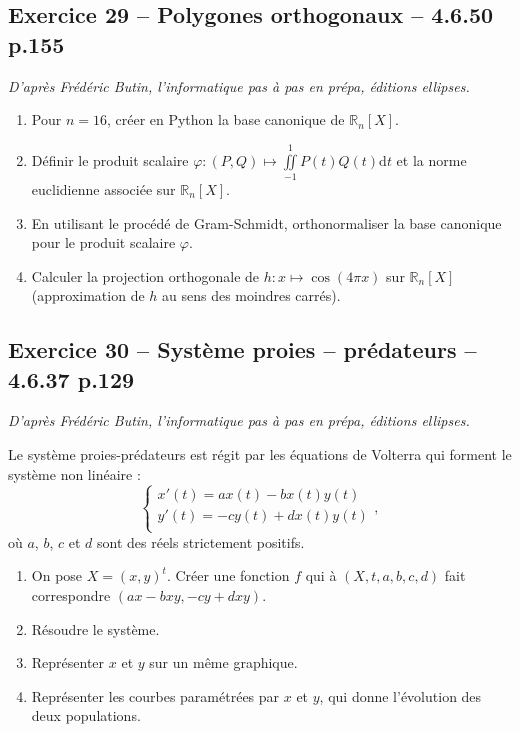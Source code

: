 \documentclass[10pt,fleqn]{article} %
\begin{document}
\begin{multicols}{2}
\subsection*{Exercice 29 -- Polygones orthogonaux -- 4.6.50 p.155}
\begin{flushright}
\textit{D'après Frédéric Butin, l'informatique pas à pas en prépa, éditions ellipses.}
\end{flushright}
\begin{enumerate}
\item Pour $n=16$, créer en Python la base canonique de $\mathbb{R}_n[X]$. 
\item Définir le produit scalaire $\varphi : \left( P,Q\right) \mapsto \iint\limits_{-1}^{1} P(t) Q(t) \text{d}t$ et la norme euclidienne associée sur $\mathbb{R}_n[X]$. 
\item En utilisant le procédé de Gram-Schmidt, orthonormaliser la  base canonique pour le produit scalaire $\varphi$.
\item Calculer la projection orthogonale de $h:x\mapsto \cos \left( 4\pi x\right)$ sur $\mathbb{R}_n[X]$ (approximation de $h$ au sens des moindres carrés).
\end{enumerate}


\subsection*{Exercice 30 -- Système proies -- prédateurs -- 4.6.37 p.129}
\begin{flushright}
\textit{D'après Frédéric Butin, l'informatique pas à pas en prépa, éditions ellipses.}
\end{flushright}
Le système proies-prédateurs est régit par les équations de Volterra qui forment le système non linéaire :
$$
\left\{
\begin{array}{l}
x'(t)=ax(t)-bx(t)y(t) \\
y'(t)=-cy(t)+dx(t)y(t) \\
\end{array}
\right. ,
$$
où $a$, $b$, $c$ et $d$ sont des réels strictement positifs. 
\begin{enumerate}
\item On pose $X=(x,y)^t$. Créer une fonction $f$ qui à $(X,t,a,b,c,d)$ fait correspondre $(ax-bxy,-cy+dxy)$.
\item Résoudre le système.
\item Représenter $x$ et $y$ sur un même graphique. 
\item Représenter les courbes paramétrées par $x$ et $y$, qui donne l'évolution des deux populations.
\end{enumerate}


\end{multicols}
\end{document}
